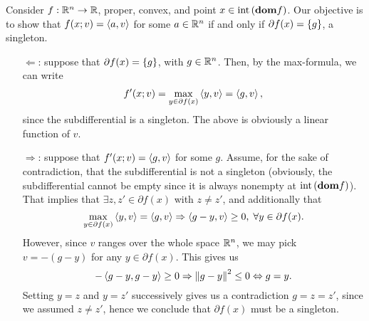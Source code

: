 \documentclass[10pt]{article}
\begin{document}
\begin{Exercise}
	\label{ex:p3}
	Consider $f: \mathbb{R}^n \to \mathbb{R}$, proper, convex, and point $x \in \mathrm{int}\left( \textbf{dom}
	f \right)$. Our objective is to show that $f(x; v) = \left\langle a, v \right\rangle$ for some $a \in
	\mathbb{R}^n$ if and only if $\partial f(x) = \left\{ g \right\}$, a singleton.
	\begin{itemize}
		\item[$\Leftarrow$:] suppose that $\partial f(x) = \left\{ g \right\}$, with $g
			\in \mathbb{R}^n$. Then, by the max-formula, we can write
			\[
				f'(x; v) = \max_{y \in \partial f(x)} \left\langle y, v \right\rangle =
					\left\langle g, v \right\rangle,
			\]
			since the subdifferential is a singleton. The above is obviously a
			linear function of $v$.
		\item[$\Rightarrow$:] suppose that $f'(x; v) = \left\langle g, v \right\rangle$ for some $g$.
			Assume, for the sake of contradiction, that the subdifferential is
			not a singleton (obviously, the subdifferential cannot be empty
			since it is always nonempty at $\mathrm{int}\left( \textbf{dom} f \right)$). That implies that
            $\exists z, z' \in \partial f(x)$ with $z \neq z'$, and additionally
            that
			\[
				\max_{y \in \partial f(x)} \left\langle y, v \right\rangle = \left\langle g, v \right\rangle \Rightarrow
                \left\langle g - y, v \right\rangle \geq 0, \; \forall y \in \partial f(x).
			\]
            However, since $v$ ranges over the whole space $\mathbb{R}^n$, we may pick
            $v = -(g - y)$ for any $y \in \partial f(x)$. This gives us
            \[
                -\left\langle g - y, g - y \right\rangle \geq 0 \Rightarrow
                \left \| g - y \right \|^2 \leq 0 \Leftrightarrow g = y.
            \]
			Setting $y = z$ and $y = z'$ successively gives us a contradiction
            $ g = z = z' $, since we assumed $z \neq z'$, hence we conclude
            that $\partial f(x)$ must be a singleton.
	\end{itemize}
\end{Exercise}
\end{document}
